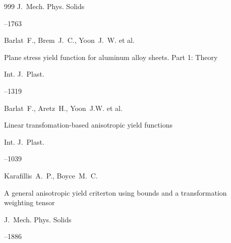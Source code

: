 \begin{thebibliography}{999}
\jour J.~Mech. Phys. Solids




--1763






\by Barlat~F., Brem~J.~C., Yoon~J.~W. et al.

\paper Plane stress yield function for aluminum alloy sheets. Part 1: Theory

\jour Int. J.~Plast.




--1319






\by Barlat~F., Aretz~H., Yoon~J.W. et al.

\paper Linear transfomation-based anisotropic yield functions

\jour Int. J.~Plast.




--1039






\by Karafillis~A.~P., Boyce~M.~C. 

\paper A general anisotropic yield criterton using bounds and a transformation weighting tensor

\jour  J.~Mech. Phys. Solids 




--1886





\end{thebibliography}
